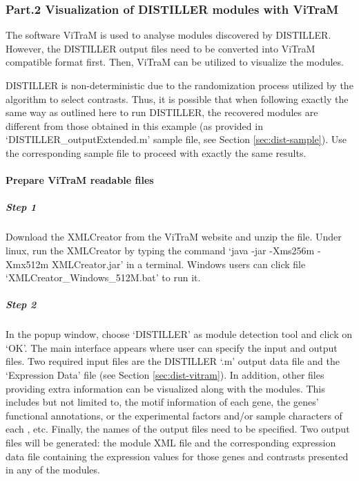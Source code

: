 \subsubsection{Part.2 Visualization of DISTILLER modules with ViTraM}
The software ViTraM is used to analyse modules discovered by DISTILLER.
However, the DISTILLER output files need to be converted into ViTraM
compatible format first.  Then, ViTraM can be utilized to visualize the
modules.

DISTILLER is non-deterministic due to the randomization process utilized by
the algorithm to select contrasts.
%
Thus, it is possible that when following exactly the same way as outlined here
to run DISTILLER, the recovered modules are different from those obtained in
this example (as provided in `DISTILLER\_outputExtended.m' sample file, see
Section \ref{sec:dist-sample}).  Use the corresponding sample file to proceed
with exactly the same results.


\paragraph{Prepare ViTraM readable files}

\begin{small} %
\subparagraph{Step 1} Download the XMLCreator from the ViTraM 
website\cite{ViTraM} and unzip the file. Under linux, run the
XMLCreator by typing the command `java -jar -Xms256m -Xmx512m
XMLCreator.jar' in a terminal.  Windows users can click file
`XMLCreator\_Windows\_512M.bat' to run it.

\subparagraph{Step 2} In the popup window, choose `DISTILLER' as module 
detection tool and click on `OK'.  
%
The main interface appears where user can specify the input and output
files.
%
Two required input files are the DISTILLER `.m' output data file and
the `Expression Data' file (see Section \ref{sec:dist-vitram}).  In
addition, other files providing extra information can be visualized
along with the modules. This includes but not limited to, the motif
information of each gene, the genes' functional annotations, or the
experimental factors and/or sample characters of each , etc.
%
Finally, the names of the output files need to be specified. Two
output files will be generated: the module XML file and the
corresponding expression data file containing the expression values
for those genes and contrasts presented in any of the modules.


\end{small} %

